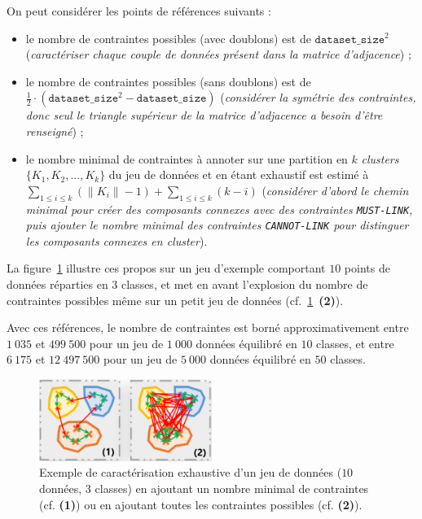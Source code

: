 			\begin{leftBarAuthorOpinion}
				On peut considérer les points de références suivants :
				\begin{itemize}
					\item le nombre de contraintes possibles (avec doublons) est de $\texttt{dataset\_size}^{2}$ (\textit{caractériser chaque couple de données présent dans la matrice d'adjacence}) ;
					\item le nombre de contraintes possibles (sans doublons) est de $\frac{1}{2} \cdot (\texttt{dataset\_size}^{2} - \texttt{dataset\_size})$ (\textit{considérer la symétrie des contraintes, donc seul le triangle supérieur de la matrice d'adjacence a besoin d'être renseigné}) ;
					\item le nombre minimal de contraintes à annoter sur une partition en $k$ \textit{clusters} $\{K_{1}, K_{2}, ..., K_{k}\} $ du jeu de données et en étant exhaustif est estimé à ${\displaystyle \sum\limits_{1 \leq i \leq k}{(\|K_{i}\|-1)} + \sum\limits_{1 \leq i \leq k}{(k-i)}} $ (\textit{considérer d'abord le chemin minimal pour créer des composants connexes avec des contraintes \texttt{MUST-LINK}, puis ajouter le nombre minimal des contraintes \texttt{CANNOT-LINK} pour distinguer les composants connexes en \textit{cluster}}).
				\end{itemize}
				La figure~\ref{figure:4.3.3-ETUDE-COUT-NOMBRE-CONTRAINTES-EXEMPLES} illustre ces propos sur un jeu d'exemple comportant $10$ points de données réparties en $3$ classes, et met en avant l'explosion du nombre de contraintes possibles même sur un petit jeu de données (cf.~\ref{figure:4.3.3-ETUDE-COUT-NOMBRE-CONTRAINTES-EXEMPLES}~\textbf{(2)}).
				
				Avec ces références, le nombre de contraintes est borné approximativement
				entre $1~035$ et $499~500$ pour un jeu de $1~000$ données équilibré en $10$ classes,
				et entre $6~175$ et $12~497~500$ pour un jeu de $5~000$ données équilibré en $50$ classes.
				\begin{figure}[H]
					\centering
					\includegraphics[width=0.5\textwidth]{figures/etude-nombre-contraintes-2-bornes-limites}
					\caption{Exemple de caractérisation exhaustive d'un jeu de données ($10$ données, $3$ classes) en ajoutant un nombre minimal de contraintes (cf. \textbf{(1)}) ou en ajoutant toutes les contraintes possibles (cf. \textbf{(2)}).}
					\label{figure:4.3.3-ETUDE-COUT-NOMBRE-CONTRAINTES-EXEMPLES}
				\end{figure}
			\end{leftBarAuthorOpinion}

